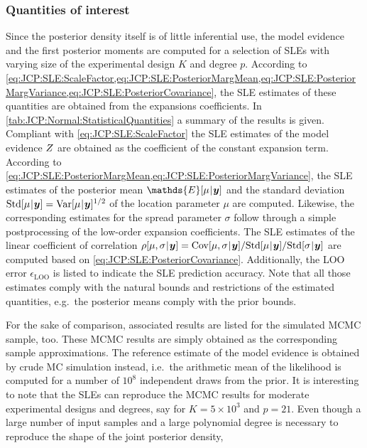 \subsubsection{Quantities of interest}
Since the posterior density itself is of little inferential use, the model evidence and the first posterior moments are computed
for a selection of SLEs with varying size of the experimental design \(K\) and degree \(p\).
According to \cref{eq:JCP:SLE:ScaleFactor,eq:JCP:SLE:PosteriorMargMean,eq:JCP:SLE:PosteriorMargVariance,eq:JCP:SLE:PosteriorCovariance},
the SLE estimates of these quantities are obtained from the expansions coefficients.
In \cref{tab:JCP:Normal:StatisticalQuantities} a summary of the results is given.
Compliant with \cref{eq:JCP:SLE:ScaleFactor} the SLE estimates of the model evidence \(Z\) are obtained as the coefficient of the constant expansion term.
According to \cref{eq:JCP:SLE:PosteriorMargMean,eq:JCP:SLE:PosteriorMargVariance}, the SLE estimates of the posterior mean \(\mathds{E}[\mu \cond \bm{y}]\)
and the standard deviation \(\mathrm{Std}[\mu {\:\!}|{\:\!} \bm{y}] = \mathrm{Var}[\mu {\:\!}|{\:\!} \bm{y}]^{1/2}\) of the location parameter \(\mu\) are computed.
Likewise, the corresponding estimates for the spread parameter \(\sigma\) follow through a simple postprocessing of the low-order expansion coefficients.
The SLE estimates of the linear coefficient of correlation
\(\rho[\mu,\sigma \cond \bm{y}] = \mathrm{Cov}[\mu,\sigma \cond \bm{y}] / \mathrm{Std}[\mu \cond \bm{y}] / \mathrm{Std}[\sigma \cond \bm{y}]\)
are computed based on \cref{eq:JCP:SLE:PosteriorCovariance}.
Additionally, the LOO error \(\epsilon_{\mathrm{LOO}}\) is listed to indicate the SLE prediction accuracy.
Note that all those estimates comply with the natural bounds and restrictions of the estimated quantities, e.g.\ the posterior means comply with the prior bounds.
\par %
For the sake of comparison, associated results are listed for the simulated MCMC sample, too.
These MCMC results are simply obtained as the corresponding sample approximations.
The reference estimate of the model evidence is obtained by crude MC simulation instead,
i.e.\ the arithmetic mean of the likelihood is computed for a number of \(10^8\) independent draws from the prior.
It is interesting to note that the SLEs can reproduce the MCMC results for moderate experimental designs and degrees, say for \(K = 5 \times 10^3\) and \(p = 21\).
Even though a large number of input samples and a large polynomial degree is necessary to reproduce the shape of the joint posterior density,
